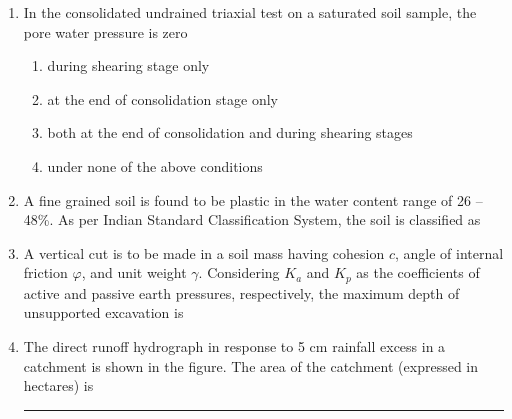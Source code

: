 \documentclass[journal]{IEEEtran}
\begin{document}
\begin{enumerate}[resume]
\item In the consolidated undrained triaxial test on a saturated soil sample, the pore water pressure is zero  \hfill {}
\begin{enumerate}
    \item during shearing stage only
    \item at the end of consolidation stage only
    \item both at the end of consolidation and during shearing stages
    \item under none of the above conditions
\end{enumerate}


\item A fine grained soil is found to be plastic in the water content range of 26 -- 48\%. As per Indian Standard Classification System, the soil is classified as \hfill {}
\begin{enumerate}
\end{enumerate}

\item A vertical cut is to be made in a soil mass having cohesion \( c \), angle of internal friction \( \varphi \), and unit weight \( \gamma \). Considering \( K_a \) and \( K_p \) as the coefficients of active and passive earth pressures, respectively, the maximum depth of unsupported excavation is \hfill {}
\begin{enumerate}
\end{enumerate}

\item The direct runoff hydrograph in response to 5 cm rainfall excess in a catchment is shown in the figure. The area of the catchment (expressed in hectares) is \rule{3cm}{0.15mm} \hfill {}


\end{enumerate}
\end{document}
